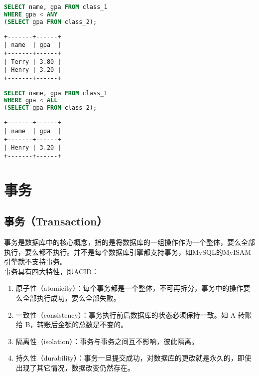 \documentclass[12pt, openany, oneside]{book}
\begin{document}

\begin{lstlisting}[language=SQL]
SELECT name, gpa FROM class_1
WHERE gpa < ANY
(SELECT gpa FROM class_2);
\end{lstlisting}

\begin{tcolorbox}
	\begin{verbatim}
+-------+------+
| name  | gpa  |
+-------+------+
| Terry | 3.80 |
| Henry | 3.20 |
+-------+------+
	\end{verbatim}
\end{tcolorbox}

\vspace{0.5cm}


\begin{lstlisting}[language=SQL]
SELECT name, gpa FROM class_1
WHERE gpa < ALL
(SELECT gpa FROM class_2);
\end{lstlisting}

\begin{tcolorbox}
	\begin{verbatim}
+-------+------+
| name  | gpa  |
+-------+------+
| Henry | 3.20 |
+-------+------+
	\end{verbatim}
\end{tcolorbox}

\newpage

\chapter{事务}

\section{事务（Transaction）}

事务是数据库中的核心概念，指的是将数据库的一组操作作为一个整体，要么全部执行，要么都不执行。并不是每个数据库引擎都支持事务，如MySQL的MyISAM引擎就不支持事务。\\

事务具有四大特性，即ACID：

\begin{enumerate}
	\item 原子性（atomicity）：每个事务都是一个整体，不可再拆分，事务中的操作要么全部执行成功，要么全部失败。

	\item 一致性（consistency）：事务执行前后数据库的状态必须保持一致。如 A 转账给 B，转账后金额的总数是不变的。

	\item 隔离性（isolation）：事务与事务之间互不影响，彼此隔离。

	\item 持久性（durability）：事务一旦提交成功，对数据库的更改就是永久的，即使出现了其它情况，数据改变仍然存在。
\end{enumerate}
\end{document}
